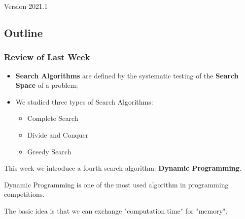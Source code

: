 \documentclass[aspectratio=169]{beamer}
\subtitle[Week 4: Dynamic Programming]{Week 4 - Dynamic Programming}
\date[]{{\smaller(last updated: \today)}}
\begin{document}
\begin{CJK}{UTF8}{ipxm}

\begin{frame}
\maketitle
\vfill

\hfill Version 2021.1
\end{frame}

\subsection{Outline}

\begin{frame}
  \frametitle{Review of Last Week}
  \begin{itemize}
  \item {\bf Search Algorithms} are defined by the systematic testing of the {\bf Search Space} of a problem;\bigskip

  \item We studied three types of Search Algorithms:
    \begin{itemize}
    \item Complete Search
    \item Divide and Conquer
    \item Greedy Search
    \end{itemize}
  \end{itemize}
  \bigskip

  \begin{block}{}
    This week we introduce a fourth search algorithm: {\bf Dynamic Programming}.
    \medskip

    Dynamic Programming is one of the most used algorithm in programming competitions.\medskip

    The basic idea is that we can exchange "computation time" for "memory".
  \end{block}
\end{frame}







\end{CJK}
\end{document}
